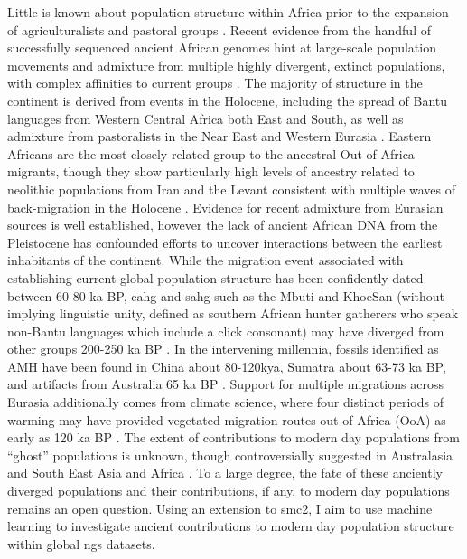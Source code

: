 Little is known about population structure within Africa prior to the expansion of agriculturalists and pastoral groups \cite{Busby2016, Patin2017}. Recent evidence from the handful of successfully sequenced ancient African genomes hint at large-scale population movements and admixture from multiple highly divergent, extinct populations, with complex affinities to current groups \cite{Skoglund2018, Lipson2019, GallegoLlorente2015a}. The majority of structure in the continent is derived from events in the Holocene, including the spread of Bantu languages from Western Central Africa both East and South, as well as admixture from pastoralists in the Near East and Western Eurasia \cite{Busby2016}. Eastern Africans are the most closely related group to the ancestral Out of Africa migrants, though they show particularly high levels of ancestry related to neolithic populations from Iran and the Levant consistent with multiple waves of back-migration in the Holocene \cite{Skoglund2017}.  
Evidence for recent admixture from Eurasian sources is well established, however the lack of ancient African DNA from the Pleistocene has confounded efforts to uncover interactions between the earliest inhabitants of the continent.
While the migration event associated with establishing current global population structure has been confidently dated between 60-80 ka BP, \gls{cahg} and \gls{sahg} such as the Mbuti and KhoeSan (without implying linguistic unity, defined as southern African hunter gatherers who speak non-Bantu languages which include a click consonant) may have diverged from other groups 200-250 ka BP \cite{Lipson2019, Schlebusch2017}. 
In the intervening millennia, fossils identified as AMH have been found in China about 80-120kya, Sumatra about 63-73 ka BP, and artifacts from Australia 65 ka BP \cite{Clarkson2017, Liu2015, Westaway2017}.
Support for multiple migrations across Eurasia additionally comes from climate science, where four distinct periods of warming may have provided vegetated migration routes out of Africa (OoA) as early as 120 ka BP \cite{Timmermann2016}.
The extent of contributions to modern day populations from ``ghost'' populations is unknown, though controversially suggested in Australasia and South East Asia \cite{Malaspinas2016, Mallick2016, Pagani2016, Rasmussen2011, Skoglund2015} and Africa  \cite{Durvasula2019, Speidel2019, Lipson2019, Hammer2011, Plagnol2006, Ragsdale2019}.
To a large degree, the fate of these anciently diverged populations and their contributions, if any, to modern day populations remains an open question. 
Using an extension to \gls{smc2}, I aim to use machine learning to investigate ancient contributions to modern day population structure within global \gls{ngs} datasets.



